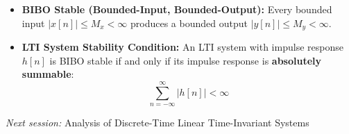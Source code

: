 \begin{itemize}
\tightlist
\item
  \textbf{BIBO Stable (Bounded-Input, Bounded-Output):} Every bounded
  input \(|x[n]| \le M_x < \infty\) produces a bounded output
  \(|y[n]| \le M_y < \infty\).
\item
  \textbf{LTI System Stability Condition:} An LTI system with impulse
  response \(h[n]\) is BIBO stable if and only if its impulse response
  is \textbf{absolutely summable}:
  \[\sum_{n=-\infty}^{\infty} |h[n]| < \infty\]
\end{itemize}

\emph{Next session:} Analysis of Discrete-Time Linear Time-Invariant
Systems
